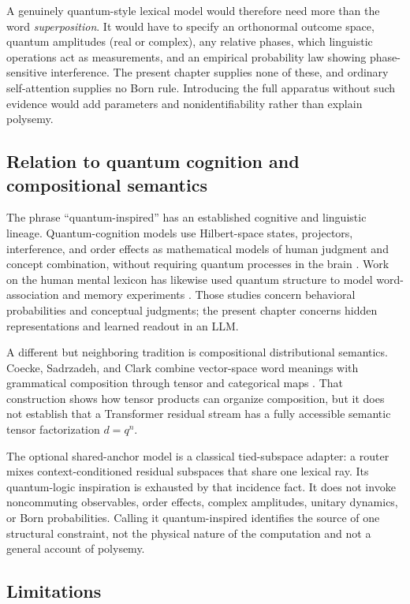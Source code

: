 \documentclass[
  aps,
  reprint,
  superscriptaddress,
  floatfix,
  nofootinbib,
  longbibliography
]{revtex4-2}
\begin{document}
A genuinely quantum-style lexical model would therefore need more than the
word \emph{superposition}.  It would have to specify an orthonormal outcome
space, quantum amplitudes (real or complex), any relative phases, which
linguistic operations act as measurements, and an empirical probability law showing phase-sensitive
interference.  The present chapter supplies none of these, and ordinary
self-attention supplies no Born rule.  Introducing the full apparatus without
such evidence would add parameters and nonidentifiability rather than explain
polysemy.

\subsection{Relation to quantum cognition and compositional semantics}
\label{sec:related-quantum}

The phrase ``quantum-inspired'' has an established cognitive and linguistic
lineage.  Quantum-cognition models use Hilbert-space states, projectors,
interference, and order effects as mathematical models of human judgment and
concept combination, without requiring quantum processes in the brain
\cite{Busemeyer2012,aerts2005b}.  Work on the human mental lexicon has likewise
used quantum structure to model word-association and memory experiments
\cite{bruza2009lexicon}.  Those studies concern behavioral probabilities and
conceptual judgments; the present chapter concerns hidden representations and
learned readout in an LLM.

A different but neighboring tradition is compositional distributional
semantics.  Coecke, Sadrzadeh, and Clark combine vector-space word meanings
with grammatical composition through tensor and categorical maps
\cite{coecke2010compositional}.  That construction shows how tensor products
can organize composition, but it does not establish that a Transformer
residual stream has a fully accessible semantic tensor factorization
$d=q^n$.

The optional shared-anchor model is a classical tied-subspace adapter: a router
mixes context-conditioned residual subspaces that share one lexical ray.  Its
quantum-logic inspiration is exhausted by that incidence fact.  It does not
invoke noncommuting observables, order effects, complex amplitudes, unitary
dynamics, or Born probabilities.  Calling it quantum-inspired identifies the
source of one structural constraint, not the physical nature of the
computation and not a general account of polysemy.

\subsection{Limitations}
\label{sec:limitations}
\end{document}
